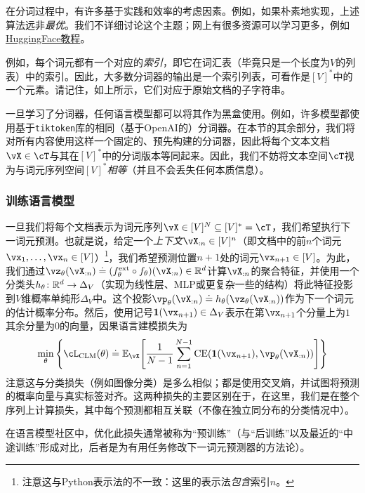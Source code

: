 \documentclass[../../book-main.tex]{subfiles}
\begin{document}
在分词过程中，有许多基于实践和效率的考虑因素。例如，如果朴素地实现，上述算法远非\textit{最优}。我们不详细讨论这个主题；网上有很多资源可以学习更多，例如\href{https://huggingface.co/learn/nlp-course/en/chapter6/5}{HuggingFace教程}。

例如，每个词元都有一个对应的\textit{索引}，即它在词汇表（毕竟只是一个长度为\(V\)的列表）中的索引。因此，大多数分词器的输出是一个索引列表，可看作是\([V]^{*}\)中的一个元素。请记住，如上所示，它们对应于原始文档的子字符串。

一旦学习了分词器，任何语言模型都可以将其作为黑盒使用。例如，许多模型都使用基于\texttt{tiktoken}库的相同（基于OpenAI的）分词器。在本节的其余部分，我们将对所有内容使用这样一个固定的、预先构建的分词器，因此将每个文本文档\(\vX \in \cT\)与其在\([V]^{*}\)中的分词版本等同起来。因此，我们不妨将文本空间\(\cT\)视为与词元序列空间\([V]^{*}\)\textit{相等}（并且不会丢失任何本质信息）。

\subsubsection{训练语言模型}

一旦我们将每个文档表示为词元序列\(\vX \in [V]^{N} \subseteq [V]^{*} = \cT\)，我们希望执行下一词元预测。也就是说，给定一个\textit{上下文}\(\vX_{:n} \in [V]^{n}\)（即文档中的前\(n\)个词元\(\vx_{1}, \dots, \vx_{n} \in [V]\)）\footnote{注意这与Python表示法的不一致：这里的表示法\textit{包含}索引\(n\)。}，我们希望预测位置\(n + 1\)处的词元\(\vx_{n + 1} \in [V]\)。为此，我们通过\(\vz_{\theta}(\vX_{:n}) \doteq (f_{\theta}^{\ext} \circ f_{\theta})(\vX_{:n}) \in \R^{d}\)计算\(\vX_{:n}\)的聚合特征，并使用一个分类头\(h_{\theta} \colon \mathbb{R}^{d} \to \Delta_{V}\)（实现为线性层、MLP或更复杂一些的结构）将此特征投影到\(V\)维概率单纯形\(\Delta_{V}\)中。这个投影\(\vp_{\theta}(\vX_{:n}) \doteq h_{\theta}(\vz_{\theta}(\vX_{:n}))\)作为下一个词元的估计概率分布。然后，使用记号\(\vone(\vx_{n + 1}) \in \Delta_{V}\)表示在第\(\vx_{n + 1}\)个分量上为\(1\)其余分量为\(0\)的向量，因果语言建模损失为
\begin{equation}\label{eq:clm_loss}
    \min_{\theta}\bc{\cL_{\mathrm{CLM}}(\theta) \doteq \Ex_{\vX}\rs{\frac{1}{N - 1}\sum_{n = 1}^{N - 1}\CE(\vone(\vx_{n + 1}), \vp_{\theta}(\vX_{:n}))}}
\end{equation}
注意这与分类损失（例如图像分类）是多么相似；都是使用交叉熵，并试图将预测的概率向量与真实标签对齐。这两种损失的主要区别在于，在这里，我们是在整个序列上计算损失，其中每个预测都相互关联（不像在独立同分布的分类情况中）。

在语言模型社区中，优化此损失通常被称为“预训练”（与“后训练”以及最近的“中途训练”形成对比，后者是为有用任务修改下一词元预测器的方法论）。
\end{document}
